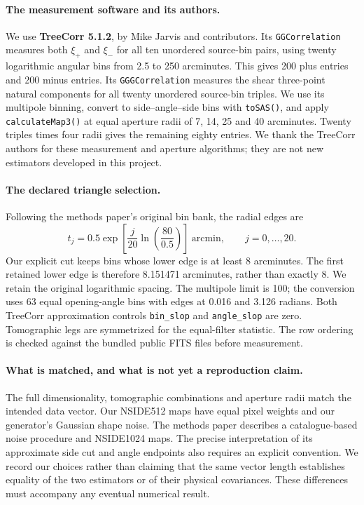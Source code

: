 \paragraph{The measurement software and its authors.}
We use \textbf{TreeCorr 5.1.2}, by Mike Jarvis and contributors. Its
\texttt{GGCorrelation} measures both $\xi_+$ and $\xi_-$ for all ten
unordered source-bin pairs, using twenty logarithmic angular bins from
2.5 to 250 arcminutes. This gives 200 plus entries and 200 minus entries.
Its \texttt{GGGCorrelation} measures the shear three-point natural components
for all twenty unordered source-bin triples. We use its multipole binning,
convert to side--angle--side bins with \texttt{toSAS()}, and apply
\texttt{calculateMap3()} at equal aperture radii of 7, 14, 25 and 40
arcminutes. Twenty triples times four radii gives the remaining eighty
entries. We thank the TreeCorr authors for these measurement and aperture
algorithms; they are not new estimators developed in this project.

\paragraph{The declared triangle selection.}
Following the methods paper's original bin bank, the radial edges are
\begin{equation}
 t_j=0.5\exp\!\left[\frac{j}{20}\ln\!\left(\frac{80}{0.5}\right)\right]
 \ \mathrm{arcmin},\qquad j=0,\ldots,20.
\end{equation}
Our explicit cut keeps bins whose lower edge is at least 8 arcminutes.
The first retained lower edge is therefore 8.151471 arcminutes, rather than
exactly 8. We retain the original logarithmic spacing. The multipole limit
is 100; the conversion uses 63 equal opening-angle bins with edges at
0.016 and 3.126 radians. Both TreeCorr approximation controls
\texttt{bin\_slop} and \texttt{angle\_slop} are zero. Tomographic legs are
symmetrized for the equal-filter statistic. The row ordering is checked
against the bundled public FITS files before measurement.

\paragraph{What is matched, and what is not yet a reproduction claim.}
The full dimensionality, tomographic combinations and aperture radii match
the intended data vector. Our NSIDE512 maps have equal pixel weights and
our generator's Gaussian shape noise. The methods paper describes a
catalogue-based noise procedure and NSIDE1024 maps. The precise interpretation
of its approximate side cut and angle endpoints also requires an explicit
convention. We record our choices rather than claiming that the same vector
length establishes equality of the two estimators or of their physical
covariances. These differences must accompany any eventual numerical result.

